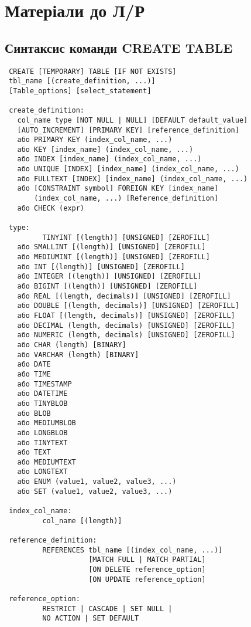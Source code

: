 \chapter{Матеріали до Л/Р }
\section{Синтаксис команди CREATE TABLE}
\label{crtab:text}
\begin{verbatim}
 CREATE [TEMPORARY] TABLE [IF NOT EXISTS] 
 tbl_name [(create_definition, ...)]
 [Table_options] [select_statement]

 create_definition:
   col_name type [NOT NULL | NULL] [DEFAULT default_value] 
   [AUTO_INCREMENT] [PRIMARY KEY] [reference_definition]
   або PRIMARY KEY (index_col_name, ...)
   або KEY [index_name] (index_col_name, ...)
   або INDEX [index_name] (index_col_name, ...)
   або UNIQUE [INDEX] [index_name] (index_col_name, ...)
   або FULLTEXT [INDEX] [index_name] (index_col_name, ...)
   або [CONSTRAINT symbol] FOREIGN KEY [index_name] 
       (index_col_name, ...) [Reference_definition]
   або CHECK (expr)

 type:
         TINYINT [(length)] [UNSIGNED] [ZEROFILL]
   або SMALLINT [(length)] [UNSIGNED] [ZEROFILL]
   або MEDIUMINT [(length)] [UNSIGNED] [ZEROFILL]
   або INT [(length)] [UNSIGNED] [ZEROFILL]
   або INTEGER [(length)] [UNSIGNED] [ZEROFILL]
   або BIGINT [(length)] [UNSIGNED] [ZEROFILL]
   або REAL [(length, decimals)] [UNSIGNED] [ZEROFILL]
   або DOUBLE [(length, decimals)] [UNSIGNED] [ZEROFILL]
   або FLOAT [(length, decimals)] [UNSIGNED] [ZEROFILL]
   або DECIMAL (length, decimals) [UNSIGNED] [ZEROFILL]
   або NUMERIC (length, decimals) [UNSIGNED] [ZEROFILL]
   або CHAR (length) [BINARY]
   або VARCHAR (length) [BINARY]
   або DATE
   або TIME
   або TIMESTAMP
   або DATETIME
   або TINYBLOB
   або BLOB
   або MEDIUMBLOB
   або LONGBLOB
   або TINYTEXT
   або TEXT
   або MEDIUMTEXT
   або LONGTEXT
   або ENUM (value1, value2, value3, ...)
   або SET (value1, value2, value3, ...)

 index_col_name:
         col_name [(length)]

 reference_definition:
         REFERENCES tbl_name [(index_col_name, ...)]
                    [MATCH FULL | MATCH PARTIAL]
                    [ON DELETE reference_option]
                    [ON UPDATE reference_option]

 reference_option:
         RESTRICT | CASCADE | SET NULL | 
         NO ACTION | SET DEFAULT


\end{verbatim}
